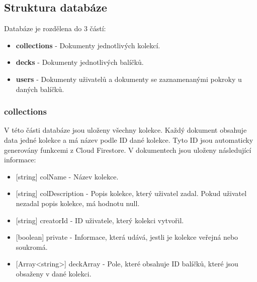 \documentclass[a4paper,12pt]{article}
\begin{document}
\subsection{Struktura databáze}
Databáze je rozdělena do 3 částí:
\begin{itemize}
\item \textbf{collections} - Dokumenty jednotlivých kolekcí.
\item \textbf{decks} - Dokumenty jednotlivých balíčků.
\item \textbf{users} - Dokumenty uživatelů a dokumenty se zaznamenanými pokroky u daných balíčků.
\end{itemize}

\subsubsection{collections}
V této části databáze jsou uloženy všechny kolekce. Každý dokument obsahuje data jedné kolekce a má název podle ID dané kolekce. Tyto ID jsou automaticky generovány funkcemi z Cloud Firestore. V dokumentech jsou uloženy následující informace:

\begin{itemize}
\item
  {[}string{]} colName - Název kolekce.
\item
  {[}string{]} colDescription - Popis kolekce, který uživatel zadal.
  Pokud uživatel nezadal popis kolekce, má hodnotu null.
\item
  {[}string{]} creatorId - ID uživatele, který kolekci vytvořil.
\item
  {[}boolean{]} private - Informace, která udává, jestli je kolekce
  veřejná nebo soukromá.
\item
  {[}Array\textless string\textgreater{]} deckArray - Pole, které
  obsahuje ID balíčků, které jsou obsaženy v dané kolekci.
\end{itemize}
\end{document}
